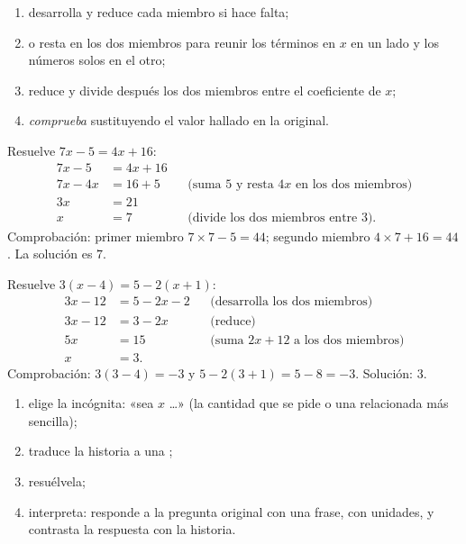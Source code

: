 \begin{method}\label{met:g8:equations:solve}
\begin{enumerate}
  \item desarrolla y reduce cada miembro si hace falta;
  \item {} o resta en los dos miembros para reunir los términos en $x$ en un
        lado y los números solos en el otro;
  \item reduce y divide después los dos miembros entre el coeficiente de $x$;
  \item \emph{comprueba} sustituyendo el valor hallado en la 
        original.
\end{enumerate}
\end{method}

\begin{example}\label{ex:g8:equations:solve}
Resuelve $7x - 5 = 4x + 16$:
\begin{align*}
7x - 5 &= 4x + 16 \\
7x - 4x &= 16 + 5
&& \text{(suma $5$ y resta $4x$ en los dos miembros)} \\
3x &= 21 \\
x &= 7 && \text{(divide los dos miembros entre 3).}
\end{align*}
Comprobación: primer miembro $7 \times 7 - 5 = 44$; segundo miembro
$4 \times 7 + 16 = 44$. La solución es $7$.
\end{example}

\begin{example}\label{ex:g8:equations:brackets}
Resuelve $3(x - 4) = 5 - 2(x + 1)$:
\begin{align*}
3x - 12 &= 5 - 2x - 2 && \text{(desarrolla los dos miembros)} \\
3x - 12 &= 3 - 2x && \text{(reduce)} \\
5x &= 15 && \text{(suma $2x + 12$ a los dos miembros)} \\
x &= 3 .
\end{align*}
Comprobación: $3(3 - 4) = -3$ y $5 - 2(3+1) = 5 - 8 = -3$. \quad Solución:
$3$.
\end{example}

\begin{method}\label{met:g8:equations:problem}
\begin{enumerate}
  \item elige la incógnita: «sea $x$ \dots» (la cantidad que se pide
        o una relacionada más sencilla);
  \item traduce la historia a una ;
  \item resuélvela;
  \item interpreta: responde a la pregunta original con una frase, con
        unidades, y contrasta la respuesta con la historia.
\end{enumerate}
\end{method}


